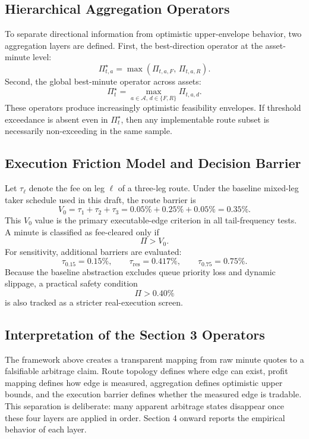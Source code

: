 \documentclass[11pt,a4paper]{article}
\begin{document}
\subsection{Hierarchical Aggregation Operators}
To separate directional information from optimistic upper-envelope behavior, two aggregation layers are defined. First, the best-direction operator at the asset-minute level:
\begin{equation}
\Pi^\star_{t,a} = \max\!\left(\Pi_{t,a,F},\,\Pi_{t,a,R}\right).
\end{equation}
Second, the global best-minute operator across assets:
\begin{equation}
\Pi^\star_t = \max_{a\in\mathcal{A},\,d\in\{F,R\}} \Pi_{t,a,d}.
\end{equation}
These operators produce increasingly optimistic feasibility envelopes. If threshold exceedance is absent even in $\Pi^\star_t$, then any implementable route subset is necessarily non-exceeding in the same sample.

\subsection{Execution Friction Model and Decision Barrier}
Let $\tau_\ell$ denote the fee on leg $\ell$ of a three-leg route. Under the baseline mixed-leg taker schedule used in this draft, the route barrier is
\begin{equation}
V_{0} = \tau_{1} + \tau_{2} + \tau_{3} = 0.05\% + 0.25\% + 0.05\% = 0.35\%.
\end{equation}
This $V_0$ value is the primary executable-edge criterion in all tail-frequency tests. A minute is classified as fee-cleared only if
\begin{equation}
\Pi > V_0.
\end{equation}
For sensitivity, additional barriers are evaluated:
\begin{equation}
\tau_{0.15}=0.15\%,\qquad
\tau_{\mathrm{res}}=0.417\%,\qquad
\tau_{0.75}=0.75\%.
\end{equation}
Because the baseline abstraction excludes queue priority loss and dynamic slippage, a practical safety condition
\begin{equation}
\Pi > 0.40\%
\end{equation}
is also tracked as a stricter real-execution screen.

\subsection{Interpretation of the Section 3 Operators}
The framework above creates a transparent mapping from raw minute quotes to a falsifiable arbitrage claim. Route topology defines where edge can exist, profit mapping defines how edge is measured, aggregation defines optimistic upper bounds, and the execution barrier defines whether the measured edge is tradable. This separation is deliberate: many apparent arbitrage states disappear once these four layers are applied in order. Section 4 onward reports the empirical behavior of each layer.
\end{document}
